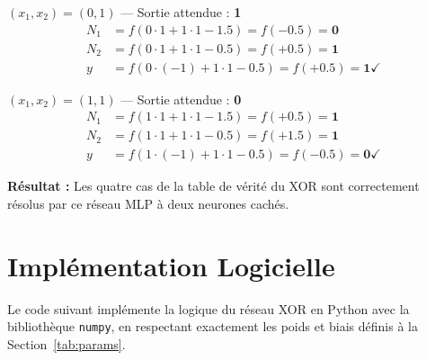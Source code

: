 \documentclass[12pt, a4paper]{article}
\begin{document}
\vspace{0.5cm}

\begin{casebox}{$(x_1, x_2) = (0, 1)$ — Sortie attendue : \textbf{1}}
\begin{align*}
    N_1 &= f\!\left(0 \cdot 1 + 1 \cdot 1 - 1.5\right) = f(-0.5) = \mathbf{0} \\
    N_2 &= f\!\left(0 \cdot 1 + 1 \cdot 1 - 0.5\right) = f(+0.5) = \mathbf{1} \\
    y   &= f\!\left(0 \cdot (-1) + 1 \cdot 1 - 0.5\right) = f(+0.5) = \mathbf{1} \checkmark
\end{align*}
\end{casebox}

\vspace{0.5cm}

\begin{casebox}{$(x_1, x_2) = (1, 1)$ — Sortie attendue : \textbf{0}}
\begin{align*}
    N_1 &= f\!\left(1 \cdot 1 + 1 \cdot 1 - 1.5\right) = f(+0.5) = \mathbf{1} \\
    N_2 &= f\!\left(1 \cdot 1 + 1 \cdot 1 - 0.5\right) = f(+1.5) = \mathbf{1} \\
    y   &= f\!\left(1 \cdot (-1) + 1 \cdot 1 - 0.5\right) = f(-0.5) = \mathbf{0} \checkmark
\end{align*}
\end{casebox}

\vspace{0.6cm}
\begin{resultbox}
\textbf{Résultat :} Les quatre cas de la table de vérité du XOR sont correctement
résolus par ce réseau MLP à deux neurones cachés.
\end{resultbox}

\section{Implémentation Logicielle}

Le code suivant implémente la logique du réseau XOR en Python avec la bibliothèque
\texttt{numpy}, en respectant exactement les poids et biais définis à la
Section~\ref{tab:params}.
\end{document}
